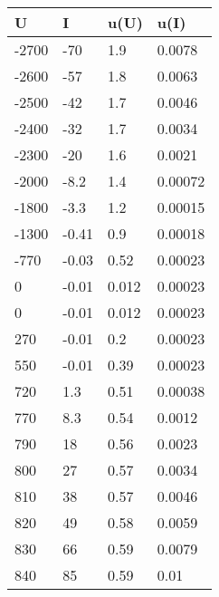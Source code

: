 \begin{table}[H]\centering 
 \begin{tabular}{|l|l|l|l|}
\hline
 \rowcolor[HTML]{EFEFEF} 
   U   &   I   &  u(U)  &  u(I)   \\ \hline

 -2700 &  -70  &  1.9   & 0.0078  \\ \hline
 -2600 &  -57  &  1.8   & 0.0063  \\ \hline
 -2500 &  -42  &  1.7   & 0.0046  \\ \hline
 -2400 &  -32  &  1.7   & 0.0034  \\ \hline
 -2300 &  -20  &  1.6   & 0.0021  \\ \hline
 -2000 & -8.2  &  1.4   & 0.00072 \\ \hline
 -1800 & -3.3  &  1.2   & 0.00015 \\ \hline
 -1300 & -0.41 &  0.9   & 0.00018 \\ \hline
 -770  & -0.03 &  0.52  & 0.00023 \\ \hline
   0   & -0.01 & 0.012  & 0.00023 \\ \hline
   0   & -0.01 & 0.012  & 0.00023 \\ \hline
  270  & -0.01 &  0.2   & 0.00023 \\ \hline
  550  & -0.01 &  0.39  & 0.00023 \\ \hline
  720  &  1.3  &  0.51  & 0.00038 \\ \hline
  770  &  8.3  &  0.54  & 0.0012  \\ \hline
  790  &  18   &  0.56  & 0.0023  \\ \hline
  800  &  27   &  0.57  & 0.0034  \\ \hline
  810  &  38   &  0.57  & 0.0046  \\ \hline
  820  &  49   &  0.58  & 0.0059  \\ \hline
  830  &  66   &  0.59  & 0.0079  \\ \hline
  840  &  85   &  0.59  &  0.01   \\ \hline

\end{tabular}
\end{table}